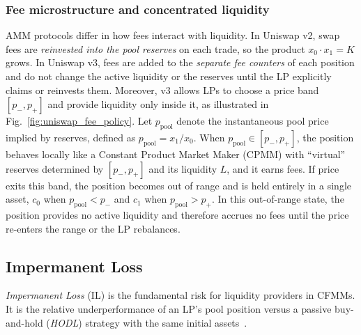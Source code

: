 \documentclass[journal]{IEEEtran}
\begin{document}
\subsubsection{Fee microstructure and concentrated liquidity}
AMM protocols differ in how fees interact with liquidity.
In Uniswap v2, swap fees are \emph{reinvested into the pool reserves} on each trade, so the product $x_0 \cdot x_1{=}K$ grows.
In Uniswap v3, fees are added to the \emph{separate fee counters} of each position and do not change the active liquidity or the reserves until the LP explicitly claims or reinvests them.
Moreover, v3 allows LPs to choose a price band $[p_{-},p_{+}]$ and provide liquidity only inside it, as illustrated in Fig.~\ref{fig:uniswap_fee_policy}.
Let $p_{\text{pool}}$ denote the instantaneous pool price implied by reserves, defined as
$p_{\text{pool}} = x_1/x_0$. 
When $p_{\text{pool}}\in[p_{-},p_{+}]$, the position behaves locally like a Constant Product Market Maker (CPMM) with ``virtual'' reserves determined by $[p_{-},p_{+}]$ and its liquidity $L$, and it earns fees. 
If price exits this band, the position becomes out of range and is held entirely in a single asset, $c_0$ when $p_{\text{pool}}<p_{-}$ and $c_1$ when $p_{\text{pool}}>p_{+}$. 
In this out-of-range state, the position provides no active liquidity and therefore accrues no fees until the price re-enters the range or the LP rebalances.


\subsection{Impermanent Loss}
\label{sec:background_il}

\emph{Impermanent Loss} (IL) is the fundamental risk for liquidity providers in CFMMs. It is the relative underperformance of an LP's pool position versus a passive buy-and-hold (\emph{HODL}) strategy with the same initial assets~\cite{evans2021liquidity, aoyagi2020liquidity}.
\end{document}
